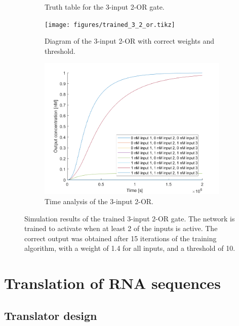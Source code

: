 \begin{figure}[H]
\begin{subfigure}[t]{.49\columnwidth}
\begin{adjustbox}{width=\textwidth}
\begin{tabular}[b]{cccc}
    \hline
    \end{tabular}
  \end{adjustbox}
    \caption{Truth table for the 3-input 2-OR gate.}
\end{subfigure}
\begin{subfigure}[t]{.49\textwidth}
  \texttt{[image: figures/trained\_3\_2\_or.tikz]}
  \caption{Diagram of the 3-input 2-OR with correct weights and threshold.}
\end{subfigure}
\hfill
\begin{subfigure}[t]{\textwidth}
  \centering
\includegraphics[width=\textwidth]{images/or_2_simulation_3input.png}
\caption{Time analysis of the 3-input 2-OR.}
\end{subfigure}
\caption{Simulation results of the trained 3-input 2-OR gate. The network is trained to activate when at least 2 of the inputs is active. The correct output was obtained after 15 iterations of the training algorithm, with a weight of 1.4 for all inputs, and a threshold of 10.}
\label{3_2_or}
\end{figure}

\section{Translation of RNA sequences}

\subsection{Translator design}

